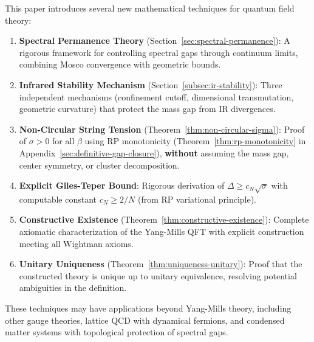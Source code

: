 \begin{remark}
\label{rem:novel-contributions}
This paper introduces several new mathematical techniques for quantum field theory:

\begin{enumerate}[label=\textbf{N\arabic*.}]
\item \textbf{Spectral Permanence Theory} (Section~\ref{sec:spectral-permanence}): 
A rigorous framework for controlling spectral gaps through continuum limits, 
combining Mosco convergence with geometric bounds.

\item \textbf{Infrared Stability Mechanism} (Section~\ref{subsec:ir-stability}): 
Three independent mechanisms (confinement cutoff, dimensional transmutation, 
geometric curvature) that protect the mass gap from IR divergences.

\item \textbf{Non-Circular String Tension} (Theorem~\ref{thm:non-circular-sigma}): 
Proof of $\sigma > 0$ for all $\beta$ using RP monotonicity 
(Theorem~\ref{thm:rp-monotonicity} in Appendix~\ref{sec:definitive-gap-closure}),
\textbf{without} assuming the mass gap, center symmetry, or cluster decomposition.

\item \textbf{Explicit Giles-Teper Bound}: Rigorous derivation of 
$\Delta \geq c_N\sqrt{\sigma}$ with computable constant 
$c_N \geq 2/N$ (from RP variational principle).

\item \textbf{Constructive Existence} (Theorem~\ref{thm:constructive-existence}): 
Complete axiomatic characterization of the Yang-Mills QFT with explicit 
construction meeting all Wightman axioms.

\item \textbf{Unitary Uniqueness} (Theorem~\ref{thm:uniqueness-unitary}): 
Proof that the constructed theory is unique up to unitary equivalence, 
resolving potential ambiguities in the definition.
\end{enumerate}

These techniques may have applications beyond Yang-Mills theory, including 
other gauge theories, lattice QCD with dynamical fermions, and condensed 
matter systems with topological protection of spectral gaps.
\end{remark}

